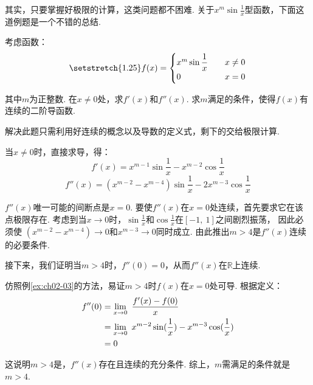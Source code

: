 其实，只要掌握好极限的计算，这类问题都不困难. 关于$x^{m}\sin\frac{1}{x}$型函数，下面这道例题是一个不错的总结.

\begin{example}[2021]
\label{ex:ch02-04}
考虑函数：
\[
\setstretch{1.25}
f(x) =
\begin{cases}
x^{m}\sin{\displaystyle\frac{1}{x}} &\quad x \ne 0 \\
0 &\quad x = 0
\end{cases}
\] 

其中$m$为正整数. 在$x \ne 0$处，求$f'(x)$和$f''(x)$.
求$m$满足的条件，使得$f(x)$有连续的二阶导函数.
\end{example}

\begin{analysis}
解决此题只需利用好连续的概念以及导数的定义式，剩下的交给极限计算.
\end{analysis}

\begin{solution}
当$x \ne 0$时，直接求导，得：
$$
f'(x) = x^{m-1}\sin \frac{1}{x}
-x^{m-2}\cos\frac{1}{x}
$$
$$
f''(x) = (x^{m-2}-x^{m-4})\sin\frac{1}{x}- 2x^{m-3} \cos \frac{1}{x}
$$\par

$f''(x)$唯一可能的间断点是$x=0$.
要使$f''(x)$在$x=0$处连续，首先要求它在该点极限存在.
考虑到当$x \to 0$时，$\sin \frac{1}{x}$和$\cos \frac{1}{x}$在$[-1,~1]$之间剧烈振荡，
因此必须使
$(x^{m-2}-x^{m-4}) \to 0$和$x^{m-3} \to 0$同时成立. 由此推出$m>4$是$f''(x)$连续的必要条件.

接下来，我们证明当$m>4$时，$f''(0)=0$，从而$f''(x)$在$\mathbb{R}$上连续. \par

仿照例\ref{ex:ch02-03}的方法，易证$m>4$时$f(x)$在$x=0$处可导. 根据定义：
\begin{equation}
    \begin{aligned}
        f''(0)
        &= \limx0 ~\frac{f'(x)-f(0)}{x} \\
        &= \limx0 ~ x^{m-2}\sin(\frac{1}{x})-x^{m-3}\cos(\frac{1}{x})\\
        &= 0
        \nonumber
    \end{aligned}
\end{equation}

这说明$m>4$是，$f''(x)$存在且连续的充分条件. 综上，$m$需满足的条件就是$m>4$.
\end{solution}

